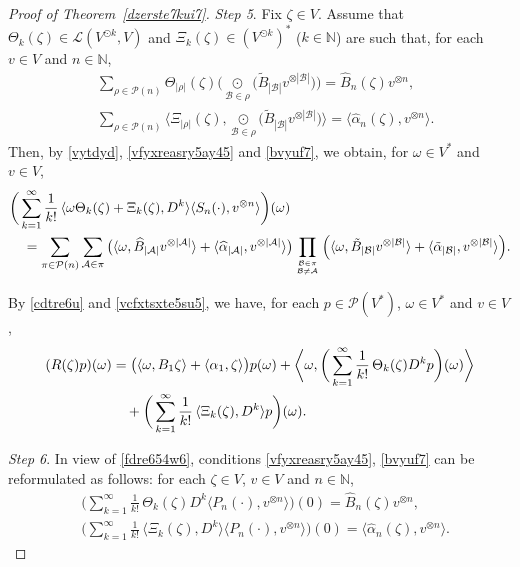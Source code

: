 \documentclass[12pt]{article}
\theoremstyle{remark}
\theoremstyle{remark}
\theoremstyle{remark}
\begin{document}
\begin{proof}[Proof of Theorem~\ref{dzerste7kui7}]
 {\it Step 5}. Fix $\zeta\in V$. Assume that $\Theta_k(\zeta)\in \mathcal L(V^{\odot k},V)$ and $\Xi_k(\zeta)\in(V^{\odot k})^*$
($k\in\mathbb N$) are 
 such that, for each  $v\in V$ and $n\in\mathbb N$,
\begin{align}
&\sum_{\rho\in\mathcal P(n)}  \Theta_{|\rho|}(\zeta)\bigg(\underset{\mathcal B\in\rho}{\odot}\big(\tilde B_{|\mathcal B|}v^{\otimes |\mathcal B|}\big)\bigg)=\widehat B_{n}(\zeta)v^{\otimes n} ,\label{vfyxreasry5ay45}\\
&\sum_{\rho\in\mathcal P(n)} \Big\langle \Xi_{|\rho|}(\zeta), \underset{\mathcal B\in\rho}{\odot}\big(\tilde B_{|\mathcal B|}v^{\otimes |\mathcal B|}\big)\Big\rangle =\langle \widehat\alpha_{n}(\zeta),v^{\otimes n}\big\rangle.
\label{bvyuf7}\end{align}
Then, by \eqref{vytdyd}, \eqref{vfyxreasry5ay45} and \eqref{bvyuf7}, we obtain, for $\omega\in V^*$ and $v\in V$,
\begin{align}
&\bigg(\sum_{k=1}^\infty \frac 1{k!}\,\langle \omega \Theta_k(\zeta)+\Xi_k(\zeta), D^{k}\rangle
\langle S_n(\cdot),v^{\otimes n}\rangle\bigg)(\omega)\notag\\ 
&\quad=\sum_{\pi\in\mathcal P(n)}\sum_{\mathcal A\in\pi}
\big(\langle\omega,\widehat B_{|\mathcal A|}v^{\otimes|\mathcal A|}\rangle+\langle\widehat \alpha_{|\mathcal A|},v^{\otimes |\mathcal A|}\rangle \big)
\prod_{{\mathcal B\in\pi}\atop{\mathcal B\ne\mathcal A}}\Big(\langle\omega,\tilde B_{|\mathcal B|}v^{\otimes|\mathcal B|} \rangle+\langle\tilde\alpha_{|\mathcal B|},
v^{\otimes|\mathcal B|}\rangle\Big).\label{vcfxtsxte5su5}
\end{align}

By \eqref{cdtre6u} and \eqref{vcfxtsxte5su5}, we have, for each $p\in\mathcal P(V^*)$, $\omega\in V^*$ and $v\in V$,
\begin{align}
(R(\zeta)p)(\omega)&=\big(\langle\omega, B_1\zeta\rangle+\langle \alpha_1,\zeta\rangle\big)p(\omega)+\bigg\langle\omega, \bigg(\sum_{k=1}^\infty \frac 1{k!}\,\Theta_k(\zeta)D^kp\bigg)(\omega)\bigg\rangle\notag\\
&\quad+\bigg(\sum_{k=1}^\infty \frac 1{k!}\,\langle \Xi_k(\zeta), D^k\rangle p\bigg)(\omega).\label{vgdctrs5ea43y7}
\end{align}


{\it Step 6}. In view of \eqref{fdre654w6}, conditions \eqref{vfyxreasry5ay45},  \eqref{bvyuf7}   can be reformulated as follows: for each 
$\zeta\in V$, $v\in V$ and $n\in\mathbb N$, 
\begin{align}
&\bigg(\sum_{k=1}^\infty \frac 1{k!}\,\Theta_k(\zeta) D^{k} \langle P_n(\cdot),v^{\otimes n}\rangle\bigg)(0)=
\widehat B_{n}(\zeta)v^{\otimes n},\label{vdrste5s5sw5}\\
&\bigg(\sum_{k=1}^\infty \frac 1{k!}\,\langle \Xi_k(\zeta), D^{k} \rangle\langle P_n(\cdot),v^{\otimes n}\rangle\bigg)(0)=\langle \widehat\alpha_{n}(\zeta),v^{\otimes n}\rangle.
\label{dzrwaw}\end{align}



\end{proof}
\end{document}
